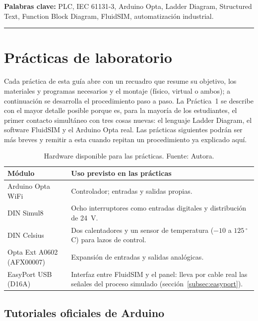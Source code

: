 \documentclass[12pt,a4paper]{article}
\begin{document}
\medskip
\noindent\textbf{Palabras clave:} PLC, IEC 61131-3, Arduino Opta, Ladder
Diagram, Structured Text, Function Block Diagram, FluidSIM, automatización
industrial.

\tableofcontents
\bigskip\hrule\bigskip

\section{Prácticas de laboratorio}

Cada práctica de esta guía abre con un recuadro que resume su objetivo,
los materiales y programas necesarios y el montaje (físico, virtual o
ambos); a continuación se desarrolla el procedimiento paso a paso. La Práctica~1 se
describe con el mayor detalle posible porque es, para la mayoría de los
estudiantes, el primer contacto simultáneo con tres cosas nuevas: el
lenguaje Ladder Diagram, el software FluidSIM y el Arduino Opta real. Las
prácticas siguientes podrán ser más breves y remitir a esta cuando repitan
un procedimiento ya explicado aquí.

\begin{table}[H]
\centering
\caption{Hardware disponible para las prácticas. Fuente: Autora.}
\label{tab:hardware}
\renewcommand{\arraystretch}{1.4}
\begin{tabularx}{\linewidth}{l X}
\toprule
\textbf{Módulo} & \textbf{Uso previsto en las prácticas} \\
\midrule
Arduino Opta WiFi     & Controlador; entradas y salidas propias. \\
DIN Simul8            & Ocho interruptores como entradas digitales y
                        distribución de 24~V. \\
DIN Celsius           & Dos calentadores y un sensor de temperatura
                        ($-10$ a $125\,^\circ$C) para lazos de control. \\
Opta Ext A0602 (AFX00007) & Expansión de entradas y salidas analógicas. \\
EasyPort USB (D16A)   & Interfaz entre FluidSIM y el panel: lleva por
                        cable real las señales del proceso simulado
                        (sección~\ref{subsec:easyport}). \\
\bottomrule
\end{tabularx}
\end{table}

\subsection{Tutoriales oficiales de Arduino}
\label{sec:tutoriales_arduino}
\end{document}
